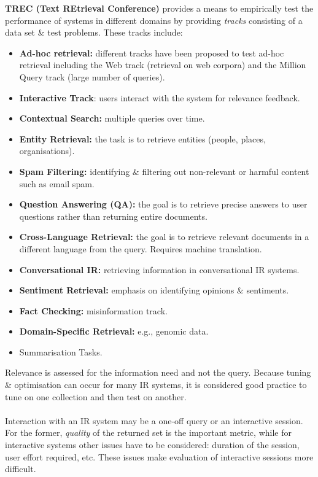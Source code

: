 \documentclass[a4paper,11pt]{article}
\begin{document}
\textbf{TREC (Text REtrieval Conference)} provides a means to empirically test the performance of systems in
different domains by providing \textit{tracks} consisting of a data set \& test problems.
These tracks include:
\begin{itemize}
    \item   \textbf{Ad-hoc retrieval:} different tracks have been proposed to test ad-hoc retrieval including the
            Web track (retrieval on web corpora) and the Million Query track (large number of queries).
    \item   \textbf{Interactive Track}: users interact with the system for relevance feedback.
    \item   \textbf{Contextual Search:} multiple queries over time.
    \item   \textbf{Entity Retrieval:} the task is to retrieve entities (people, places, organisations).
    \item   \textbf{Spam Filtering:} identifying \& filtering out non-relevant or harmful content such as email
            spam.
    \item   \textbf{Question Answering (QA):} the goal is to retrieve precise answers to user questions rather than
            returning entire documents.
    \item   \textbf{Cross-Language Retrieval:} the goal is to retrieve relevant documents in a different language
            from the query.
            Requires machine translation.
    \item   \textbf{Conversational IR:} retrieving information in conversational IR systems.
    \item   \textbf{Sentiment Retrieval:} emphasis on identifying opinions \& sentiments.
    \item   \textbf{Fact Checking:} misinformation track.
    \item   \textbf{Domain-Specific Retrieval:} e.g., genomic data.
    \item   Summarisation Tasks.
\end{itemize}

Relevance is assessed for the information need and not the query.
Because tuning \& optimisation can occur for many IR systems, it is considered good practice to tune on one 
collection and then test on another.
\\\\
Interaction with an IR system may be a one-off query or an interactive session.
For the former, \textit{quality} of the returned set is the important metric, while for interactive systems other
issues have to be considered: duration of the session, user effort required, etc.
These issues make evaluation of interactive sessions more difficult.
\end{document}

